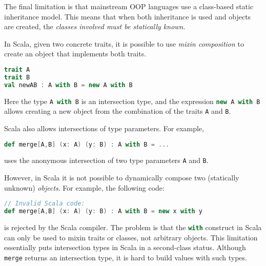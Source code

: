 The final limitation is that mainstream OOP languages use a class-based static
inheritance model. This means that when both inheritance is used and objects are
created, the \emph{classes involved must be statically known}.
\begin{comment}
Intersection types date back as early as Coppo et al.'s
work~\cite{coppo1981functional}. Since then researchers have studied
intersection types, and some languages have adopted them in one form or another.

In Java, for example,
\begin{lstlisting}[language=java]
interface AwithB extends A, B {}
\end{lstlisting}
introduces a new interface \lstinline$AwithB$ that satisfies the interface of
both \lstinline{A} and \lstinline{B}. 
\end{comment}
In Scala, given two concrete traits, it is
possible to use \textit{mixin composition} to create an object that implements
both traits.
\begin{lstlisting}[language=scala]
trait A
trait B
val newAB : A with B = new A with B
\end{lstlisting}
\noindent Here the type \lstinline[language=scala]{A with B} is an intersection type,
and the expression \lstinline[language=scala]{new A with B} allows creating a new
object from the combination of the traits \lstinline{A} and
\lstinline{B}.

Scala also allows intersections of type parameters. For example,
\begin{lstlisting}[language=scala]
def merge[A,B] (x: A) (y: B) : A with B = ...
\end{lstlisting}
uses the anonymous intersection of two type parameters \lstinline{A} and
\lstinline{B}.

However, in Scala it is not possible to dynamically compose two
(statically unknown) \emph{objects}. For
example, the following code:
\begin{lstlisting}[language=scala]
// Invalid Scala code:
def merge[A,B] (x: A) (y: B) : A with B = new x with y
\end{lstlisting}
is rejected by the Scala compiler. The problem is that the \lstinline[language=scala]$with$
construct in Scala can only be used to mixin traits or classes, not
arbitrary objects. This limitation essentially puts intersection types in Scala
in a second-class status. Although \lstinline{merge} returns an intersection
type, it is hard to build values with such types.

